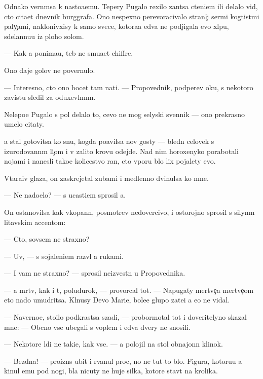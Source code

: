 \documentclass[10pt]{book}
\begin{document}
Odnako vern{\e}msa k nasto{\y}a{\x}emu. Tepery Pugalo rexilo zan{\ia}tsa cteni{\y}em ili delalo vid, cto cita{\y}et dnevnik burggrafa. Ono nespexno perevoracivalo strani{\c}i ser{\yi}mi kogtist{\yi}mi paly{\c}ami, naklonivxisy k samo{\y} svece, kotora{\y}a {\y}edva ne podjigala {\y}evo xl{\ia}pu, sdelannu{\y}u iz ploho{\y} solom{\yi}.

— Kak {\y}a ponima{\y}u, teb{\ia} ne smu{\x}a{\y}et chiffre.

Ono daje golov{\yi} ne povernulo.

— Interesno, cto ono hocet tam na{\y}ti. — Propovednik, podperev {\x}oku, s nekotoro{\y} zavist{\y}u sledil za oduxevl{\e}nn{\yi}m.

Nelepo{\y}e Pugalo s pol{\ia} delalo to, cevo ne mog selyski{\y} sv{\ia}{\x}ennik — ono prekrasno umelo citaty.

{\Y}a stal gotovitsa ko snu, kogda po{\y}avilsa nov{\yi}{\y} gosty — bledn{\yi}{\y} celovek s izurodovann{\yi}m li{\c}om i v zalito{\y} krov{\y}u odejde. Nad nim horoxenyko porabotali nojami i nanesli tako{\y}e kolicestvo ran, cto vporu b{\yi}lo lix pojalety {\y}evo.

V{\yi}tara{\x}iv glaza, on zaskrejetal zubami i medlenno dvinulsa ko mne.

— Ne nado{\y}elo? — s ucasti{\y}em sprosil {\y}a.

On ostanovilsa kak vkopann{\yi}{\y}, posmotrev nedovercivo, i ostorojno sprosil s silyn{\yi}m litavskim accentom:

— Cto, sovsem ne straxno?

— Uv{\yi}, — s sojaleni{\y}em razv{\e}l {\y}a rukami.

— I vam ne straxno? — sprosil neizvestn{\yi}{\y} u Propovednika.

— {\Y}a m{\e}rtv, kak i t{\yi}, poludurok, — provorcal tot. — Napugaty mertve{\c}a mertve{\c}om eto nado umudritsa. Kl{\ia}nusy Devo{\y} Mari{\y}e{\y}, bole{\y}e glupo{\y} zate{\y}i {\y}a {\y}e{\x}o ne vidal.

— Naverno{\y}e, sto{\y}ilo podkrastsa szadi, — probormotal tot i doveritelyno skazal mne: — Ob{\yi}cno vse ubegali s voplem i {\y}edva dvery ne snosili.

— Nekotor{\yi}{\y}e l{\io}di ne taki{\y}e, kak vse. — {\Y}a polojil na stol obnajonn{\yi}{\y} klinok.

— Bezdna! — proizn{\e}s ubit{\yi}{\y} i rvanul proc, no ne tut-to b{\yi}lo. Figura, kotoru{\y}u {\y}a kinul {\y}emu pod nogi, b{\yi}la nicuty ne huje silka, kotor{\yi}{\y}e stav{\ia}t na krolika.
\end{document}
